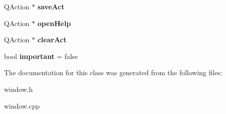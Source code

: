 \begin{DoxyCompactItemize}
\item 
\hypertarget{class_window_a6372feaa0a9d38275aa6a12bab5eeeab}{}Q\+Action $\ast$ {\bfseries save\+Act}\label{class_window_a6372feaa0a9d38275aa6a12bab5eeeab}

\item 
\hypertarget{class_window_ad333f8fa49cbbffacfbbf5737f160776}{}Q\+Action $\ast$ {\bfseries open\+Help}\label{class_window_ad333f8fa49cbbffacfbbf5737f160776}

\item 
\hypertarget{class_window_a61e25d1848a6dabe0ff43e85d3a93799}{}Q\+Action $\ast$ {\bfseries clear\+Act}\label{class_window_a61e25d1848a6dabe0ff43e85d3a93799}

\item 
\hypertarget{class_window_adf147b15222fd3eae05eae4fae2d0222}{}bool {\bfseries important} = false\label{class_window_adf147b15222fd3eae05eae4fae2d0222}

\end{DoxyCompactItemize}


The documentation for this class was generated from the following files\+:\begin{DoxyCompactItemize}
\item 
window.\+h\item 
window.\+cpp\end{DoxyCompactItemize}
